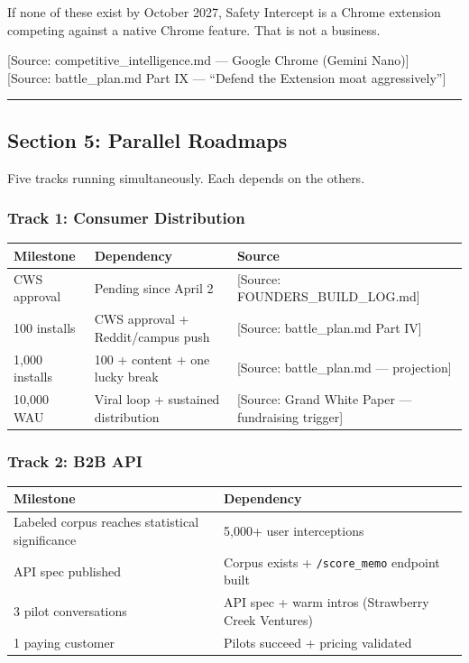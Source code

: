 \documentclass[11pt, letterpaper]{article}
\newcommand{\source}[1]{\textcolor{citation}{[Source: #1]}}
\begin{document}
  If none of these exist by October 2027, Safety Intercept is a Chrome extension competing against a native Chrome feature. That is not a business.

  \source{competitive\_intelligence.md --- Google Chrome (Gemini Nano)}\\
  \source{battle\_plan.md Part IX --- ``Defend the Extension moat aggressively''}

  \vspace{12pt}
  \hrule
  \vspace{12pt}

  \subsection{Section 5: Parallel Roadmaps}

  Five tracks running simultaneously. Each depends on the others.

  \subsubsection{Track 1: Consumer Distribution}

  \begin{tabular}{l l l}
  \toprule
  \textbf{Milestone} & \textbf{Dependency} & \textbf{Source} \\
  \midrule
  CWS approval & Pending since April 2 & \source{FOUNDERS\_BUILD\_LOG.md} \\
  100 installs & CWS approval + Reddit/campus push & \source{battle\_plan.md Part IV} \\
  1,000 installs & 100 + content + one lucky break & \source{battle\_plan.md --- projection} \\
  10,000 WAU & Viral loop + sustained distribution & \source{Grand White Paper --- fundraising trigger} \\
  \bottomrule
  \end{tabular}

  \subsubsection{Track 2: B2B API}

  \begin{tabular}{l l}
  \toprule
  \textbf{Milestone} & \textbf{Dependency} \\
  \midrule
  Labeled corpus reaches statistical significance & 5,000+ user interceptions \\
  API spec published & Corpus exists + \texttt{/score\_memo} endpoint built \\
  3 pilot conversations & API spec + warm intros (Strawberry Creek Ventures) \\
  1 paying customer & Pilots succeed + pricing validated \\
  \bottomrule
  \end{tabular}
\end{document}
